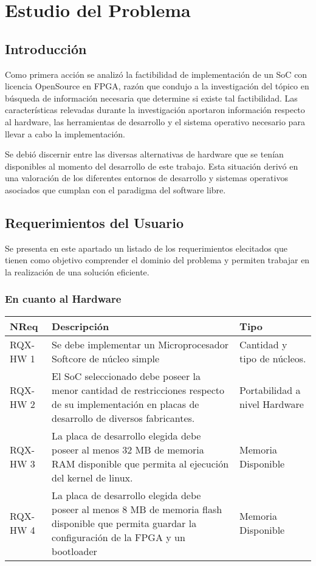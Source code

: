 \chapter{Estudio del Problema}
	\section{Introducción}
	Como primera acción se analizó la factibilidad de implementación de un SoC con licencia OpenSource en FPGA, razón que condujo a la investigación del
	tópico en búsqueda de información necesaria que determine si existe tal factibilidad. Las características relevadas durante la investigación
	aportaron información respecto al hardware, las herramientas de desarrollo y el sistema operativo necesario para llevar a cabo la implementación. 
	
    Se debió discernir entre las diversas alternativas de hardware que se tenían disponibles al momento del desarrollo de este trabajo. Esta situación
    derivó en una valoración de los diferentes entornos de desarrollo y sistemas operativos asociados que cumplan con el paradigma del software
    libre.
	
	\section{Requerimientos del Usuario}
	Se presenta en este apartado un listado de los requerimientos elecitados que tienen como objetivo comprender el dominio del problema y permiten
	trabajar en la realización de una solución eficiente.
	
		\subsection{En cuanto al Hardware}
		\begin{tabular}{ p{2.5cm} p{8cm} p{3cm} }
		\hline 
		\rowcolor[gray]{0.8} N\textordmasculine Req & Descripción & Tipo\\
		\hline
		RQX-HW 1 &  Se debe implementar un Microprocesador Softcore de núcleo simple & Cantidad y tipo de núcleos. \\
		\hline
		RQX-HW 2 &  El SoC seleccionado debe poseer la menor cantidad de restricciones respecto de su implementación en placas de desarrollo de diversos
		fabricantes. & Portabilidad a nivel Hardware\\
		\hline
		RQX-HW 3 & La placa de desarrollo elegida debe poseer al menos 32 MB de memoria RAM disponible que permita al ejecución del kernel de linux. &
		Memoria Disponible\\
		\hline
		RQX-HW 4 & La placa de desarrollo elegida debe poseer al menos 8 MB de memoria flash disponible que permita guardar la configuración de la FPGA y un
		bootloader & Memoria Disponible\\
		\hline
		\end{tabular}
					
